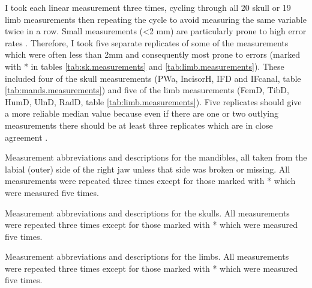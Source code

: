 	I took each linear measurement three times, cycling through all 20 skull or 19 limb measurements then repeating the cycle to avoid measuring the same variable twice in a row. Small measurements (<2 mm) are particularly prone to high error rates \citep{Cardini2008}. Therefore, I took five separate replicates of some of the measurements which were often less than 2mm and consequently most prone to errors (marked with * in tables \ref{tab:sk.measurements} and  \ref{tab:limb.measurements}). These included four of the skull measurements (PWa, IncisorH, IFD and IFcanal, table \ref{tab:mands.measurements}) and five of the limb measurements (FemD, TibD, HumD, UlnD, RadD, table \ref{tab:limb.measurements}). 
	Five replicates should give a more reliable median value because even if there are one or two outlying measurements there should be at least three replicates which are in close agreement \citep{Cooper2009}.
	



\begin{table}[!htbp]
	\caption[Mandible measurements]
			{Measurement abbreviations and descriptions for the mandibles, all taken from the labial (outer) side of the right jaw unless that side was broken or missing. All measurements were repeated three times except for those marked with * which were measured five times.}
	
	\label{tab:mands.measurements}
\end{table}

\begin{table}[!htbp]
	\caption[Skull measurements]
			{Measurement abbreviations and descriptions for the skulls. All measurements were repeated three times except for those marked with * which were measured five times.}%
	
	\label{tab:sk.measurements}
\end{table}



\begin{table}[!htbp]
	\caption[Limb measurements]
		{Measurement abbreviations and descriptions for the limbs. All measurements were repeated three times except for those marked with * which were measured five times.} %
	
	\label{tab:limb.measurements}
\end{table}


